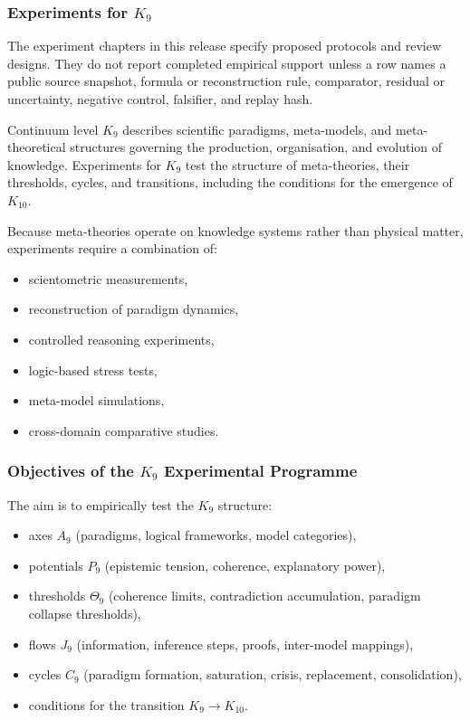 
\subsubsection{Experiments for \texorpdfstring{$K_9$}{K_9}}

The experiment chapters in this release specify proposed protocols and review designs. They do not report completed empirical support unless a row names a public source snapshot, formula or reconstruction rule, comparator, residual or uncertainty, negative control, falsifier, and replay hash.
\label{sec:experiments-k9}

Continuum level $K_9$ describes scientific paradigms,
meta-models, and meta-theoretical structures governing the
production, organisation, and evolution of knowledge.
Experiments for $K_9$ test the structure of meta-theories,
their thresholds, cycles, and transitions, including the
conditions for the emergence of $K_{10}$.

Because meta-theories operate on knowledge systems rather than
physical matter, experiments require a combination of:

\begin{itemize}
    \item scientometric measurements,
    \item reconstruction of paradigm dynamics,
    \item controlled reasoning experiments,
    \item logic-based stress tests,
    \item meta-model simulations,
    \item cross-domain comparative studies.
\end{itemize}



\subsubsection{Objectives of the \texorpdfstring{$K_9$}{K_9} Experimental Programme}

The aim is to empirically test the $K_9$ structure:

\begin{itemize}
    \item axes $A_9$ (paradigms, logical frameworks, model categories),
    \item potentials $P_9$ (epistemic tension, coherence, explanatory power),
    \item thresholds $\Theta_9$ (coherence limits, contradiction accumulation,
          paradigm collapse thresholds),
    \item flows $J_9$ (information, inference steps, proofs,
          inter-model mappings),
    \item cycles $C_9$ (paradigm formation, saturation, crisis,
          replacement, consolidation),
    \item conditions for the transition $K_9 \to K_{10}$.
\end{itemize}



